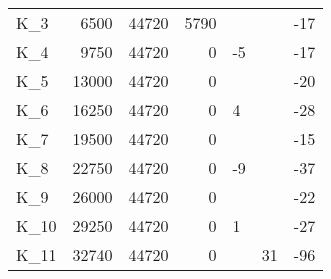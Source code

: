 \begin{tabular}{lrrrllr}
K\_3 & 6500 & 44720 & 5790 &  &  & -17 \\
K\_4 & 9750 & 44720 & 0 & -5 &  & -17 \\
K\_5 & 13000 & 44720 & 0 &  &  & -20 \\
K\_6 & 16250 & 44720 & 0 & 4 &  & -28 \\
K\_7 & 19500 & 44720 & 0 &  &  & -15 \\
K\_8 & 22750 & 44720 & 0 & -9 &  & -37 \\
K\_9 & 26000 & 44720 & 0 &  &  & -22 \\
K\_10 & 29250 & 44720 & 0 & 1 &  & -27 \\
K\_11 & 32740 & 44720 & 0 &  & 31 & -96 \\
\bottomrule
\end{tabular}
